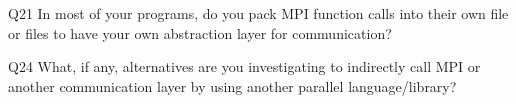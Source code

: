 \begin{description}%
\item{Q21} In most of your programs, do you pack MPI function calls into their own file or files to have your own abstraction layer for communication?%
\item{Q24} What, if any, alternatives are you investigating to indirectly call MPI or another communication layer by using another parallel language/library?%
\end{description}%

